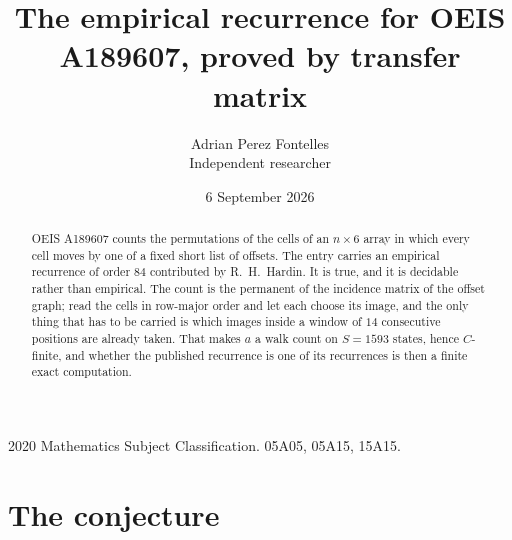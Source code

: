 \documentclass[11pt,a4paper]{article}
\title{The empirical recurrence for OEIS A189607, proved by transfer matrix}
\author{Adrian Perez Fontelles\\ \small Independent researcher}
\date{6 September 2026}
\theoremstyle{plain}
\theoremstyle{definition}
\begin{document}
\maketitle

\begin{abstract}
OEIS A189607 counts the permutations of the cells of an $n\times6$ array in which every cell
moves by one of a fixed short list of offsets. The entry carries an empirical recurrence of
order $84$ contributed by R.~H.~Hardin. It is true, and it is decidable rather than
empirical. The count is the permanent of the incidence matrix of the offset graph; read the
cells in row-major order and let each choose its image, and the only thing that has to be
carried is which images inside a window of $14$ consecutive positions are already taken.
That makes $a$ a walk count on $S=1593$ states, hence $C$-finite, and whether the published
recurrence is one of its recurrences is then a finite exact computation.
\end{abstract}

\noindent\small 2020 Mathematics Subject Classification. 05A05, 05A15, 15A15.\normalsize

\section{The conjecture}
\end{document}
